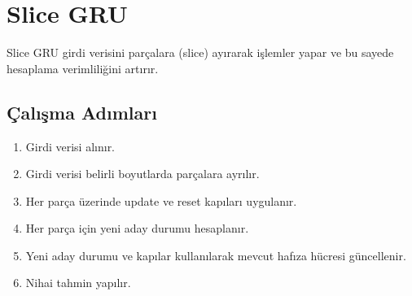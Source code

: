 \section{Slice GRU}
Slice GRU girdi verisini parçalara (slice) ayırarak işlemler yapar ve bu sayede hesaplama verimliliğini artırır. 

\subsection{Çalışma Adımları}
\begin{enumerate}
	\item Girdi verisi alınır.
	\item Girdi verisi belirli boyutlarda parçalara ayrılır.
	\item Her parça üzerinde update ve reset kapıları uygulanır.
	\item Her parça için yeni aday durumu hesaplanır.
	\item Yeni aday durumu ve kapılar kullanılarak mevcut hafıza hücresi güncellenir.
	\item Nihai tahmin yapılır.
\end{enumerate}

\newpage